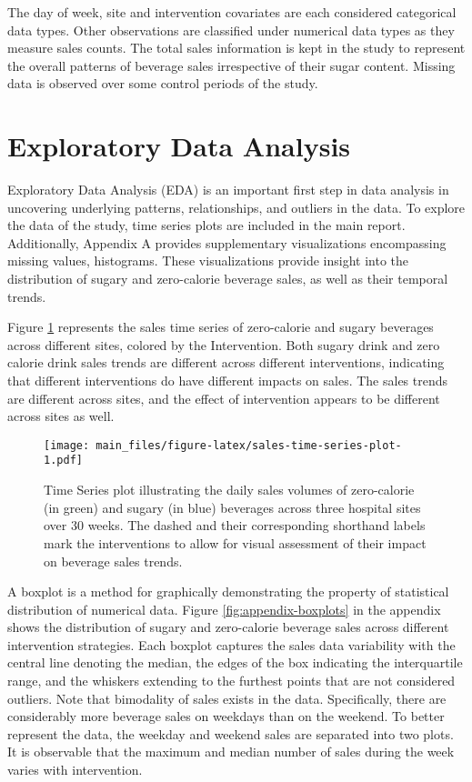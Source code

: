 \documentclass[
]{article}
\begin{document}
The day of week, site and intervention covariates are each considered categorical data types. Other observations are classified under numerical data types as they measure sales counts. The total sales information is kept in the study to represent the overall patterns of beverage sales irrespective of their sugar content. Missing data is observed over some control periods of the study.

\hypertarget{exploratory-data-analysis}{%
\section{Exploratory Data Analysis}\label{exploratory-data-analysis}}

Exploratory Data Analysis (EDA) is an important first step in data analysis in uncovering underlying patterns, relationships, and outliers in the data. To explore the data of the study, time series plots are included in the main report. Additionally, Appendix A provides supplementary visualizations encompassing missing values, histograms. These visualizations provide insight into the distribution of sugary and zero-calorie beverage sales, as well as their temporal trends.

Figure \ref{fig:sales-time-series-plot} represents the sales time series of zero-calorie and sugary beverages across different sites, colored by the Intervention. Both sugary drink and zero calorie drink sales trends are different across different interventions, indicating that different interventions do have different impacts on sales. The sales trends are different across sites, and the effect of intervention appears to be different across sites as well.

\begin{figure}
\centering
\texttt{[image: main\_files/figure-latex/sales-time-series-plot-1.pdf]}
\caption{\label{fig:sales-time-series-plot}Time Series plot illustrating the daily sales volumes of zero-calorie (in green) and sugary (in blue) beverages across three hospital sites over 30 weeks. The dashed and their corresponding shorthand labels mark the interventions to allow for visual assessment of their impact on beverage sales trends.}
\end{figure}

A boxplot is a method for graphically demonstrating the property of statistical distribution of numerical data. Figure \ref{fig:appendix-boxplots} in the appendix shows the distribution of sugary and zero-calorie beverage sales across different intervention strategies. Each boxplot captures the sales data variability with the central line denoting the median, the edges of the box indicating the interquartile range, and the whiskers extending to the furthest points that are not considered outliers. Note that bimodality of sales exists in the data. Specifically, there are considerably more beverage sales on weekdays than on the weekend. To better represent the data, the weekday and weekend sales are separated into two plots. It is observable that the maximum and median number of sales during the week varies with intervention.
\end{document}
